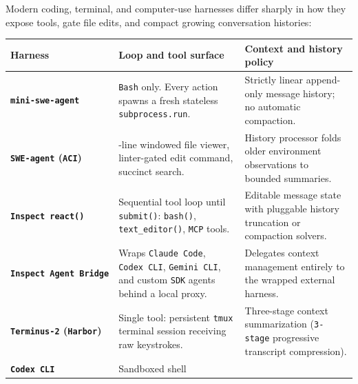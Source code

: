 \documentclass[10pt,letterpaper]{article}
\begin{document}
Modern coding, terminal, and computer-use harnesses differ sharply in
how they expose tools, gate file edits, and compact growing conversation
histories:

{\footnotesize\setlength{\tabcolsep}{3.8pt}\renewcommand{\arraystretch}{1.15}
\begin{longtable}[]{@{}
  >{\raggedright\arraybackslash}p{}
  >{\raggedright\arraybackslash}p{}
  >{\raggedright\arraybackslash}p{}@{}}
\toprule\noalign{}
\begin{minipage}[b]{\linewidth}\raggedright
\textbf{Harness}
\end{minipage} & \begin{minipage}[b]{\linewidth}\raggedright
\textbf{Loop and tool surface}
\end{minipage} & \begin{minipage}[b]{\linewidth}\raggedright
\textbf{Context and history policy}
\end{minipage} \\
\midrule\noalign{}
\endhead
\bottomrule\noalign{}
\endlastfoot
\textbf{\texttt{mini-\allowbreak{}swe-\allowbreak{}agent}} & \texttt{Bash} only. Every action
spawns a fresh stateless \texttt{subprocess.\allowbreak{}run}. & Strictly linear
append-only message history; no automatic compaction. \\
\textbf{\texttt{SWE-agent} (\texttt{ACI})} & 100-line windowed file
viewer, linter-gated edit command, succinct search. & History processor
folds older environment observations to bounded summaries. \\
\textbf{\texttt{Inspect\ react(\allowbreak{})}} & Sequential tool loop until
\texttt{submit()}: \texttt{bash()}, \texttt{text\_\allowbreak{}editor(\allowbreak{})},
\texttt{MCP} tools. & Editable message state with pluggable history
truncation or compaction solvers. \\
\textbf{\texttt{Inspect\ Agent\ Bridge}} & Wraps \texttt{Claude\ Code},
\texttt{Codex\ CLI}, \texttt{Gemini\ CLI}, and custom \texttt{SDK}
agents behind a local proxy. & Delegates context management entirely to
the wrapped external harness. \\
\textbf{\texttt{Terminus-\allowbreak{}2} (\texttt{Harbor})} & Single tool: persistent
\texttt{tmux} terminal session receiving raw keystrokes. & Three-stage
context summarization (\texttt{3-stage} progressive transcript
compression). \\
\textbf{\texttt{Codex\ CLI}} & Sandboxed shell

\end{longtable}}
\end{document}
